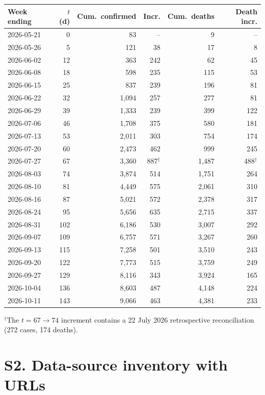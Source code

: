 \documentclass[11pt]{article}
\begin{document}
\begin{center}
\begin{tabular}{lrrrrr}
\toprule
Week ending & $t$ (d) & Cum.\ confirmed & Incr. & Cum.\ deaths & Death incr. \\
\midrule
2026-05-21 & 0   & 83   & --   & 9    & -- \\
2026-05-26 & 5   & 121  & 38   & 17   & 8  \\
2026-06-02 & 12  & 363  & 242  & 62   & 45 \\
2026-06-08 & 18  & 598  & 235  & 115  & 53 \\
2026-06-15 & 25  & 837  & 239  & 196  & 81 \\
2026-06-22 & 32  & 1,094& 257  & 277  & 81 \\
2026-06-29 & 39  & 1,333& 239  & 399  & 122\\
2026-07-06 & 46  & 1,708& 375  & 580  & 181\\
2026-07-13 & 53  & 2,011& 303  & 754  & 174\\
2026-07-20 & 60  & 2,473& 462  & 999  & 245\\
2026-07-27 & 67  & 3,360& 887$^\dagger$ & 1,487 & 488$^\dagger$ \\
2026-08-03 & 74  & 3,874& 514  & 1,751& 264\\
2026-08-10 & 81  & 4,449& 575  & 2,061& 310\\
2026-08-16 & 87  & 5,021& 572  & 2,378& 317\\
2026-08-24 & 95  & 5,656& 635  & 2,715& 337\\
2026-08-31 & 102 & 6,186& 530  & 3,007& 292\\
2026-09-07 & 109 & 6,757& 571  & 3,267& 260\\
2026-09-13 & 115 & 7,258& 501  & 3,510& 243\\
2026-09-20 & 122 & 7,773& 515  & 3,759& 249\\
2026-09-27 & 129 & 8,116& 343  & 3,924& 165\\
2026-10-04 & 136 & 8,603& 487  & 4,148& 224\\
2026-10-11 & 143 & 9,066& 463  & 4,381& 233\\
\bottomrule
\end{tabular}
\end{center}
\vspace{4pt}
\noindent $^\dagger$The $t=67\to74$ increment contains a 22 July 2026 retrospective
reconciliation (272 cases, 174 deaths).

\section*{S2. Data-source inventory with URLs}
\label{sec:si_sources}
\end{document}
